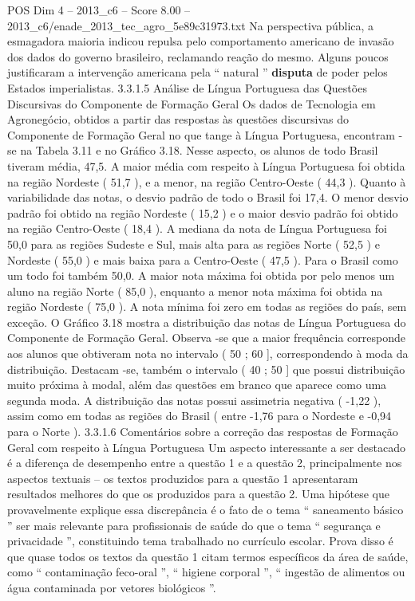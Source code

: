 \begin{textsample}{POS Dim 4 – 2013\_c6 – Score 8.00 – 2013\_c6/enade\_2013\_tec\_agro\_5e89c31973.txt}
Na perspectiva pública, a esmagadora maioria indicou repulsa pelo comportamento americano de invasão dos dados do governo brasileiro, reclamando reação do mesmo.
Alguns poucos justificaram a intervenção americana pela “ natural ” \textbf{disputa} de poder pelos Estados imperialistas. 3.3.1.5 Análise de Língua Portuguesa das Questões Discursivas do Componente de Formação Geral Os dados de Tecnologia em Agronegócio, obtidos a partir das respostas às questões discursivas do Componente de Formação Geral no que tange à Língua Portuguesa, encontram -se na Tabela 3.11 e no Gráfico 3.18.
Nesse aspecto, os alunos de todo Brasil tiveram média, 47,5.
A maior média com respeito à Língua Portuguesa foi obtida na região Nordeste ( 51,7 ), e a menor, na região Centro-Oeste ( 44,3 ).
Quanto à variabilidade das notas, o desvio padrão de todo o Brasil foi 17,4.
O menor desvio padrão foi obtido na região Nordeste ( 15,2 ) e o maior desvio padrão foi obtido na região Centro-Oeste ( 18,4 ).
A mediana da nota de Língua Portuguesa foi 50,0 para as regiões Sudeste e Sul, mais alta para as regiões Norte ( 52,5 ) e Nordeste ( 55,0 ) e mais baixa para a Centro-Oeste ( 47,5 ).
Para o Brasil como um todo foi também 50,0.
A maior nota máxima foi obtida por pelo menos um aluno na região Norte ( 85,0 ), enquanto a menor nota máxima foi obtida na região Nordeste ( 75,0 ).
A nota mínima foi zero em todas as regiões do país, sem exceção.
O Gráfico 3.18 mostra a distribuição das notas de Língua Portuguesa do Componente de Formação Geral.
Observa -se que a maior frequência corresponde aos alunos que obtiveram nota no intervalo ( 50 ; 60 ], correspondendo à moda da distribuição.
Destacam -se, também o intervalo ( 40 ; 50 ] que possui distribuição muito próxima à modal, além das questões em branco que aparece como uma segunda moda.
A distribuição das notas possui assimetria negativa ( -1,22 ), assim como em todas as regiões do Brasil ( entre -1,76 para o Nordeste e -0,94 para o Norte ). 3.3.1.6 Comentários sobre a correção das respostas de Formação Geral com respeito à Língua Portuguesa Um aspecto interessante a ser destacado é a diferença de desempenho entre a questão 1 e a questão 2, principalmente nos aspectos textuais – os textos produzidos para a questão 1 apresentaram resultados melhores do que os produzidos para a questão 2.
Uma hipótese que provavelmente explique essa discrepância é o fato de o tema “ saneamento básico ” ser mais relevante para profissionais de saúde do que o tema “ segurança e privacidade ”, constituindo tema trabalhado no currículo escolar.
Prova disso é que quase todos os textos da questão 1 citam termos específicos da área de saúde, como “ contaminação feco-oral ”, “ higiene corporal ”, “ ingestão de alimentos ou água contaminada por vetores biológicos ”.

\end{textsample}
